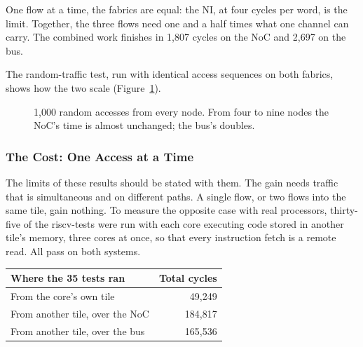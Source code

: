 \documentclass[11pt,a4paper]{article}
\begin{document}
One flow at a time, the fabrics are equal: the NI, at four cycles per word, is
the limit. Together, the three flows need one and a half times what one
channel can carry. The combined work finishes in 1,807 cycles on the NoC and
2,697 on the bus.

The random-traffic test, run with identical access sequences on both fabrics,
shows how the two scale (Figure~\ref{fig:scale}).

\begin{figure}[h]
\centering
{}
\caption{1,000 random accesses from every node. From four to nine nodes the
NoC's time is almost unchanged; the bus's doubles.}
\label{fig:scale}
\end{figure}

\subsubsection{The Cost: One Access at a Time}

The limits of these results should be stated with them. The gain needs traffic
that is simultaneous and on different paths. A single flow, or two flows into
the same tile, gain nothing. To measure the opposite case with real
processors, thirty-five of the riscv-tests were run with each core executing
code stored in another tile's memory, three cores at once, so that every
instruction fetch is a remote read. All pass on both systems.

\begin{tabularx}{\textwidth}{@{}Yr@{}}
\toprule
\textbf{Where the 35 tests ran} & \textbf{Total cycles} \\
\midrule
From the core's own tile & 49,249 \\
From another tile, over the NoC & 184,817 \\
From another tile, over the bus & 165,536 \\
\bottomrule
\end{tabularx}
\end{document}
